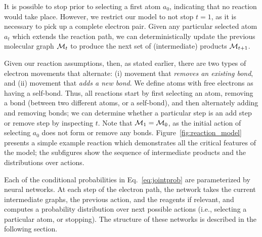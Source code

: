 It is possible to stop prior to selecting a first atom $a_0$, indicating that no reaction would take place.
However, we restrict our model to not stop $t\!=\!1$, as it is necessary to pick up a complete electron pair. 
Given any particular selected atom $a_t$ which extends the reaction path, we can deterministically update the previous molecular graph ${\mathcal{M}}_{t}$ to produce the next set of (intermediate) products ${\mathcal{M}}_{t+1}$.

Given our reaction assumptions, then, as stated earlier, there are two types of electron movements that alternate: 
(i) movement that \emph{removes an existing bond}, and 
(ii) movement that \emph{adds a new bond}. 
We define atoms with free electrons as having a self-bond.
Thus, all reactions start by first selecting an atom, removing a bond (between two different atoms, or a self-bond), and then alternately adding and removing bonds;
we can determine whether a particular step is an add step or remove step by inspecting $t$.
Note that ${\mathcal{M}}_1 = {\mathcal{M}}_0$, as the initial action of selecting $a_0$ does not form or remove any bonds.
Figure~\ref{fig:reaction_model} presents a simple example reaction which demonstrates all the critical features of the model;
the subfigures show the sequence of intermediate products and the distributions over actions.


Each of the conditional probabilities in Eq.~\eqref{eq:jointprob} are parameterized by neural networks.
At each step of the electron path, the network takes the current intermediate graphs, 
the previous action, and the reagents if relevant, 
and computes a probability distribution over next possible actions (i.e., selecting a particular atom, or stopping).
The structure of these networks is described in the following section.

